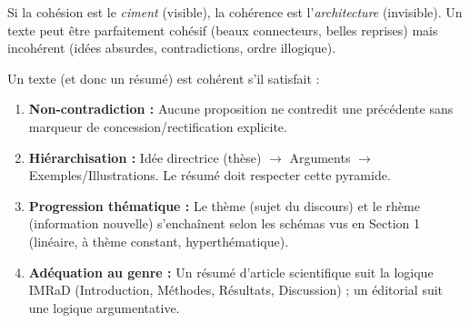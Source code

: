 \documentclass[11pt]{article}
\begin{document}
Si la cohésion est le \emph{ciment} (visible), la cohérence est l'\emph{architecture} (invisible). Un texte peut être parfaitement cohésif (beaux connecteurs, belles reprises) mais incohérent (idées absurdes, contradictions, ordre illogique).

\begin{propriete}
Un texte (et donc un résumé) est cohérent s'il satisfait :
\begin{enumerate}
    \item \textbf{Non-contradiction :} Aucune proposition ne contredit une précédente sans marqueur de concession/rectification explicite.
    \item \textbf{Hiérarchisation :} Idée directrice (thèse) $\to$ Arguments $\to$ Exemples/Illustrations. Le résumé doit respecter cette pyramide.
    \item \textbf{Progression thématique :} Le thème (sujet du discours) et le rhème (information nouvelle) s'enchaînent selon les schémas vus en Section 1 (linéaire, à thème constant, hyperthématique).
    \item \textbf{Adéquation au genre :} Un résumé d'article scientifique suit la logique IMRaD (Introduction, Méthodes, Résultats, Discussion) ; un éditorial suit une logique argumentative.
\end{enumerate}
\end{propriete}
\end{document}
